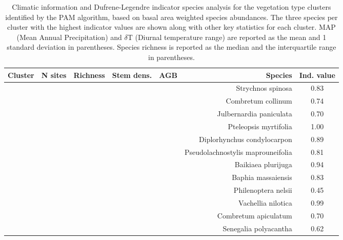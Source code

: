 \begin{table}[h]
\centering
\caption{Climatic information and Dufrene-Legendre indicator species analysis for the vegetation type clusters identified by the PAM algorithm, based on basal area weighted species abundances. The three species per cluster with the highest indicator values are shown along with other key statistics for each cluster. MAP (Mean Annual Precipitation) and $\delta$T (Diurnal temperature range) are reported as the mean and 1 standard deviation in parentheses. Species richness is reported as the median and the interquartile range in parentheses.} 
\label{clust_summ}
\begin{tabular}{S[table-format=1.0]S[table-format=2.0]rrrrS[table-format=1.2]}
  \toprule
{Cluster} & {N sites} & {Richness} & {Stem dens.} & {AGB} & {Species} & {Ind. value} \\ 
  \midrule
{} & {} & {} & {} & {} & Strychnos spinosa & 0.83 \\ 
   & & & & & Combretum collinum & 0.74 \\ 
   & & & & & Julbernardia paniculata & 0.70 \\ 
   \midrule
{} & {} & {} & {} & {} & Pteleopsis myrtifolia & 1.00 \\ 
  	& & & & &  Diplorhynchus condylocarpon & 0.89 \\ 
  	& & & & & Pseudolachnostylis maprouneifolia & 0.81 \\ 
   \midrule
{} & {} &  {} & {} & {} & Baikiaea plurijuga & 0.94 \\ 
  	& & & &  & Baphia massaiensis & 0.83 \\ 
  	& & & &  & Philenoptera nelsii & 0.45 \\ 
   \midrule
{} & {} & {} & {} &  {} & Vachellia nilotica & 0.99 \\ 
  	& & & & & Combretum apiculatum & 0.70 \\ 
  	& & & & & Senegalia polyacantha & 0.62 \\ 
   \bottomrule
\end{tabular}
\end{table}

